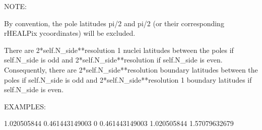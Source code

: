 \documentclass[a4paper,12ptopenany,oneside,english]{sphinxmanual}
\begin{document}
\begin{fulllineitems}
\begin{fulllineitems}
\sphinxAtStartPar
NOTE:

\sphinxAtStartPar
By convention, the pole latitudes pi/2 and \sphinxhyphen{}pi/2 (or their
corresponding rHEALPix y\sphinxhyphen{}coordinates) will be excluded.

\sphinxAtStartPar
There are 2*self.N\_side**resolution \sphinxhyphen{} 1 nuclei
latitudes between the poles if self.N\_side is odd and
2*self.N\_side**resolution if self.N\_side is even.
Consequently, there are 2*self.N\_side**resolution
boundary latitudes between the poles if self.N\_side is odd and
2*self.N\_side**resolution \sphinxhyphen{} 1 boundary latitudes if self.N\_side is
even.

\sphinxAtStartPar
EXAMPLES:

\begin{sphinxVerbatim}[commandchars=\\\{\}]
  
      
     
\end{sphinxVerbatim}
\begin{description}
\sphinxAtStartPar
\sphinxhyphen{}1.020505844
\sphinxhyphen{}0.461443149003
\sphinxhyphen{}0
0.461443149003
1.020505844
1.57079632679

\begin{sphinxVerbatim}[commandchars=\\\{\}]
       
     
\end{sphinxVerbatim}


\end{description}
\end{fulllineitems}
\end{fulllineitems}
\end{document}
